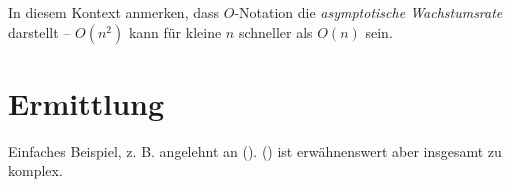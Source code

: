 In diesem Kontext anmerken, dass $O$-Notation die \emph{asymptotische Wachstumsrate} darstellt -- $O(n^2)$ kann für kleine $n$ schneller als $O(n)$ sein.



\section{Ermittlung}

Einfaches Beispiel, z. B. angelehnt an \cite[69]{sha2011} (). \cite{ahu1974} () ist erwähnenswert aber insgesamt zu komplex.
